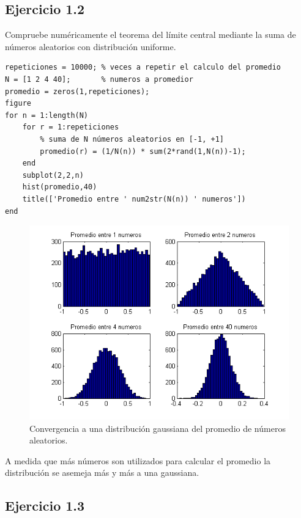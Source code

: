 \documentclass[11pt,a4paper,final]{article}
\begin{document}
\subsection{Ejercicio 1.2}


Compruebe numéricamente el teorema del límite central mediante la suma de números aleatorios con distribución uniforme.

\begin{verbatim}
repeticiones = 10000; % veces a repetir el calculo del promedio
N = [1 2 4 40];       % numeros a promedior
promedio = zeros(1,repeticiones);
figure
for n = 1:length(N)
    for r = 1:repeticiones
        % suma de N números aleatorios en [-1, +1]
        promedio(r) = (1/N(n)) * sum(2*rand(1,N(n))-1);
    end
    subplot(2,2,n)
    hist(promedio,40)
    title(['Promedio entre ' num2str(N(n)) ' numeros'])
end
\end{verbatim}

\begin{figure}
	\centering
	\includegraphics[width=\textwidth]{Ejercicio1_04.png}
	\caption{Convergencia a una distribución gaussiana del promedio de números aleatorios.}
	\label{ejercicio14}
\end{figure}

A medida que más números son utilizados para calcular el promedio la distribución se asemeja más y más a una gaussiana.


\subsection{Ejercicio 1.3}
\end{document}

